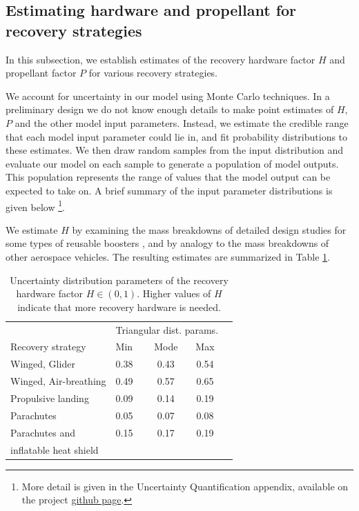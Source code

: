 \documentclass{iaf-iac}
\begin{document}
\begin{multicols}{2}
\subsection{Estimating hardware and propellant for recovery strategies} \label{sec:est_hardware_and_propellant}
In this subsection, we establish estimates of the recovery hardware factor $H$ and propellant factor $P$ for various recovery strategies.

We account for uncertainty in our model using Monte Carlo techniques. In a preliminary design we do not know enough details to make point estimates of $H$, $P$ and the other model input parameters. Instead, we estimate the credible range that each model input parameter could lie in, and fit probability distributions to these estimates. We then draw random samples from the input distribution and evaluate our model on each sample to generate a population of model outputs. This population represents the range of values that the model output can be expected to take on. A brief summary of the input parameter distributions is given below \footnote{More detail is given in the Uncertainty Quantification appendix, available on the project \href{https://github.com/mvernacc/lvreuse}{github page}.}.

We estimate $H$ by examining the mass breakdowns of detailed design studies for some types of reusable boosters \cite{Healy1998, Isakowitz2004, Sippel2003, Hellman2005}, and by analogy to the mass breakdowns of other aerospace vehicles. The resulting estimates are summarized in Table \ref{tab:hardware_factor_distributions}.

\begin{table}[H]
    \centering
    \caption{\label{tab:hardware_factor_distributions} Uncertainty distribution parameters of the recovery hardware factor $H \in (0, 1)$. Higher values of $H$ indicate that more recovery hardware is needed.}
    \begin{tabular}{l l c c c}
    \hline
     & \multicolumn{3}{c}{Triangular dist. params.} \\
     Recovery strategy & Min & Mode & Max \\
    \hline
    \hline
    Winged, Glider  & 0.38 & 0.43 & 0.54 \\
    Winged, Air-breathing & 0.49 & 0.57 & 0.65 \\
    \hline
    Propulsive landing  & 0.09 & 0.14 & 0.19 \\
    \hline
    Parachutes & 0.05 & 0.07 & 0.08 \\
    Parachutes and & 0.15 & 0.17 & 0.19 \\
    \quad inflatable heat shield & & & \\
    \hline
    \end{tabular}
\end{table}


\end{multicols}
\end{document}
